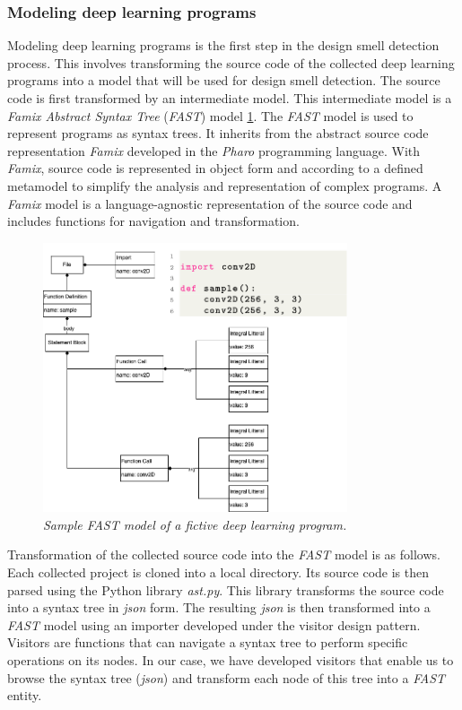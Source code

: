 \subsubsection{Modeling deep learning programs}
\label{sec:modelingDeepLearningPrograms}
Modeling deep learning programs is the first step in the design smell detection
process. This involves transforming the source code of the collected deep
learning programs into a model that will be used for design smell detection. The source code is first transformed by an intermediate model. This intermediate model is a \emph{Famix Abstract Syntax Tree} (\emph{FAST}) model \ref{fig:fast}. The \emph{FAST} model is used to represent programs as syntax trees. It inherits from the abstract source code representation \emph{Famix} developed in the \emph{Pharo} programming language. With \emph{Famix}, source code is represented in object form and according to a defined metamodel to simplify the analysis and representation of complex programs. A \emph{Famix} model is a language-agnostic representation of the source code and includes functions for navigation and transformation.\\

\begin{figure}[h]
  \centering
  \includegraphics[width=0.8\textwidth]{figure/fast.png}
  \caption{\emph{Sample \emph{FAST} model of a fictive deep learning program.}}
  \label{fig:fast}
\end{figure}

Transformation of the collected source code into the \emph{FAST} model is as
follows. Each collected project is cloned into a local directory. Its source
code is then parsed using the Python library \emph{ast.py}. This library
transforms the source code into a syntax tree in \emph{json} form. The resulting
\emph{json} is then transformed into a \emph{FAST} model using an importer
developed under the visitor design pattern. Visitors are functions that can
navigate a syntax tree to perform specific operations on its nodes. In our case,
we have developed visitors that enable us to browse the syntax tree
(\emph{json}) and transform each node of this tree into a \emph{FAST} entity.

